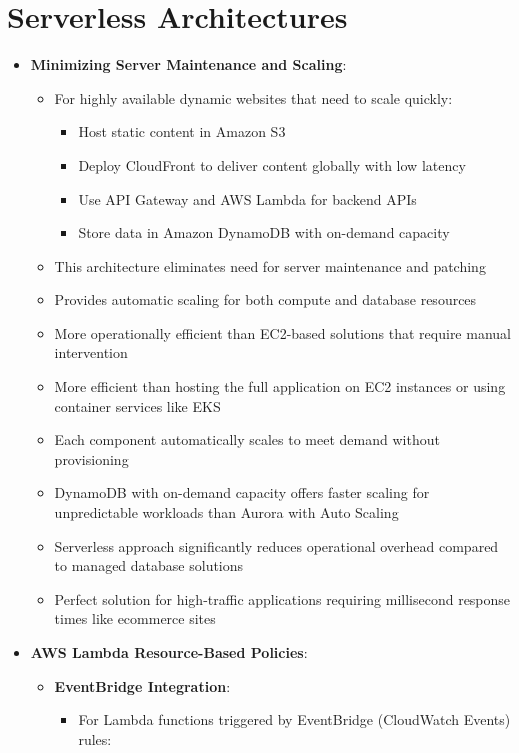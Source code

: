 \documentclass[11pt,a4paper]{report}
\begin{document}
\chapter{Serverless Architectures}

\begin{itemize}
  \item \textbf{Minimizing Server Maintenance and Scaling}:
\begin{itemize}
  \item For highly available dynamic websites that need to scale quickly:
\begin{itemize}
  \item Host static content in Amazon S3
  \item Deploy CloudFront to deliver content globally with low latency
  \item Use API Gateway and AWS Lambda for backend APIs
  \item Store data in Amazon DynamoDB with on-demand capacity
\end{itemize}
  \item This architecture eliminates need for server maintenance and patching
  \item Provides automatic scaling for both compute and database resources
  \item More operationally efficient than EC2-based solutions that require manual intervention
  \item More efficient than hosting the full application on EC2 instances or using container services like EKS
  \item Each component automatically scales to meet demand without provisioning
  \item DynamoDB with on-demand capacity offers faster scaling for unpredictable workloads than Aurora with Auto Scaling
  \item Serverless approach significantly reduces operational overhead compared to managed database solutions
  \item Perfect solution for high-traffic applications requiring millisecond response times like ecommerce sites
\end{itemize}
  \item \textbf{AWS Lambda Resource-Based Policies}:
\begin{itemize}
  \item \textbf{EventBridge Integration}:
\begin{itemize}
  \item For Lambda functions triggered by EventBridge (CloudWatch Events) rules:

\end{itemize}
\end{itemize}
\end{itemize}
\end{document}

